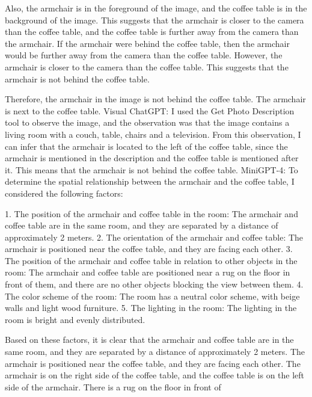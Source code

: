 \begin{enumerate}
    Also, the armchair is in the foreground of the image, and the coffee table is in the background of the image. This suggests that the armchair is closer to the camera than the coffee table, and the coffee table is further away from the camera than the armchair. If the armchair were behind the coffee table, then the armchair would be further away from the camera than the coffee table. However, the armchair is closer to the camera than the coffee table. This suggests that the armchair is not behind the coffee table.
    
    Therefore, the armchair in the image is not behind the coffee table. The armchair is next to the coffee table.
    \subitem Visual ChatGPT: I used the Get Photo Description tool to observe the image, and the observation was that the image contains a living room with a couch, table, chairs and a television. From this observation, I can infer that the armchair is located to the left of the coffee table, since the armchair is mentioned in the description and the coffee table is mentioned after it. This means that the armchair is not behind the coffee table.
    \subitem MiniGPT-4: To determine the spatial relationship between the armchair and the coffee table, I considered the following factors:

    1. The position of the armchair and coffee table in the room: The armchair and coffee table are in the same room, and they are separated by a distance of approximately 2 meters.
    2. The orientation of the armchair and coffee table: The armchair is positioned near the coffee table, and they are facing each other.
    3. The position of the armchair and coffee table in relation to other objects in the room: The armchair and coffee table are positioned near a rug on the floor in front of them, and there are no other objects blocking the view between them.
    4. The color scheme of the room: The room has a neutral color scheme, with beige walls and light wood furniture.
    5. The lighting in the room: The lighting in the room is bright and evenly distributed.
    
    Based on these factors, it is clear that the armchair and coffee table are in the same room, and they are separated by a distance of approximately 2 meters. The armchair is positioned near the coffee table, and they are facing each other. The armchair is on the right side of the coffee table, and the coffee table is on the left side of the armchair. There is a rug on the floor in front of
\end{enumerate}
